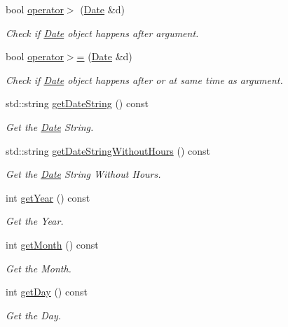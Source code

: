 \begin{DoxyCompactItemize}
bool \mbox{\hyperlink{classDate_a0c2a1a6f890da1f9a360fab87e7109a3}{operator$>$}} (\mbox{\hyperlink{classDate}{Date}} \&d)
\begin{DoxyCompactList}\small\item\em Check if \mbox{\hyperlink{classDate}{Date}} object happens after argument. \end{DoxyCompactList}\item 
bool \mbox{\hyperlink{classDate_a3dd4c3c4818d69669927bec072ff85ce}{operator$>$=}} (\mbox{\hyperlink{classDate}{Date}} \&d)
\begin{DoxyCompactList}\small\item\em Check if \mbox{\hyperlink{classDate}{Date}} object happens after or at same time as argument. \end{DoxyCompactList}\item 
std\+::string \mbox{\hyperlink{classDate_a733c89177097f0d7f5cc2f68f5593856}{get\+Date\+String}} () const
\begin{DoxyCompactList}\small\item\em Get the \mbox{\hyperlink{classDate}{Date}} String. \end{DoxyCompactList}\item 
std\+::string \mbox{\hyperlink{classDate_a54b53336c8ba897fae4d2bbb0aa84a99}{get\+Date\+String\+Without\+Hours}} () const
\begin{DoxyCompactList}\small\item\em Get the \mbox{\hyperlink{classDate}{Date}} String Without Hours. \end{DoxyCompactList}\item 
int \mbox{\hyperlink{classDate_a8b0869f34c2b38d108ab83ee2e770e5d}{get\+Year}} () const
\begin{DoxyCompactList}\small\item\em Get the Year. \end{DoxyCompactList}\item 
int \mbox{\hyperlink{classDate_a332f6e3a2f6a40d73742b6dab7be0f64}{get\+Month}} () const
\begin{DoxyCompactList}\small\item\em Get the Month. \end{DoxyCompactList}\item 
int \mbox{\hyperlink{classDate_a0f253815240e70f4c39cb93cc68bd3f4}{get\+Day}} () const
\begin{DoxyCompactList}\small\item\em Get the Day. \end{DoxyCompactList}\item 

\end{DoxyCompactItemize}
